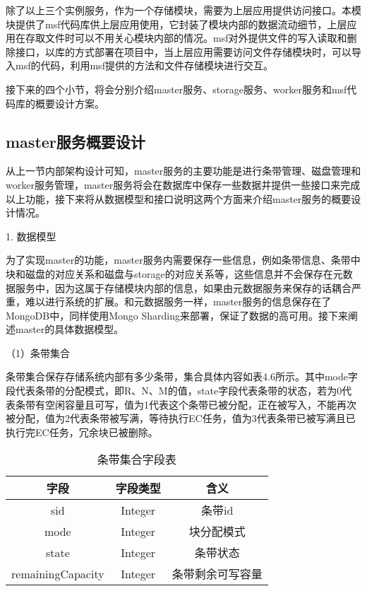 除了以上三个实例服务，作为一个存储模块，需要为上层应用提供访问接口。本模块提供了msf代码库供上层应用使用，它封装了模块内部的数据流动细节，上层应用在存取文件时可以不用关心模块内部的情况。msf对外提供文件的写入读取和删除接口，以库的方式部署在项目中，当上层应用需要访问文件存储模块时，可以导入msf的代码，利用msf提供的方法和文件存储模块进行交互。

接下来的四个小节，将会分别介绍master服务、storage服务、worker服务和msf代码库的概要设计方案。

\subsection{master服务概要设计}

从上一节内部架构设计可知，master服务的主要功能是进行条带管理、磁盘管理和worker服务管理，master服务将会在数据库中保存一些数据并提供一些接口来完成以上功能，接下来将从数据模型和接口说明这两个方面来介绍master服务的概要设计情况。

1. 数据模型

为了实现master的功能，master服务内需要保存一些信息，例如条带信息、条带中块和磁盘的对应关系和磁盘与storage的对应关系等，这些信息并不会保存在元数据服务中，因为这属于存储模块内部的信息，如果由元数据服务来保存的话耦合严重，难以进行系统的扩展。和元数据服务一样，master服务的信息保存在了MongoDB中，同样使用Mongo Sharding来部署，保证了数据的高可用。接下来阐述master的具体数据模型。

（1）条带集合

条带集合保存存储系统内部有多少条带，集合具体内容如表4.6所示。其中mode字段代表条带的分配模式，即R、N、M的值，state字段代表条带的状态，若为0代表条带有空闲容量且可写，值为1代表这个条带已被分配，正在被写入，不能再次被分配，值为2代表条带被写满，等待执行EC任务，值为3代表条带已被写满且已执行完EC任务，冗余块已被删除。

\begin{table}[h]
    \centering
    \caption{条带集合字段表}
    \begin{tabular}{ccc}
      \toprule
      字段   & 字段类型   & 含义                          \\
      \midrule
      sid               & Integer   & 条带id             \\
      mode              & Integer   & 块分配模式          \\
      state             & Integer   & 条带状态            \\
      remainingCapacity & Integer   & 条带剩余可写容量     \\
      \bottomrule
    \end{tabular}
\end{table}

